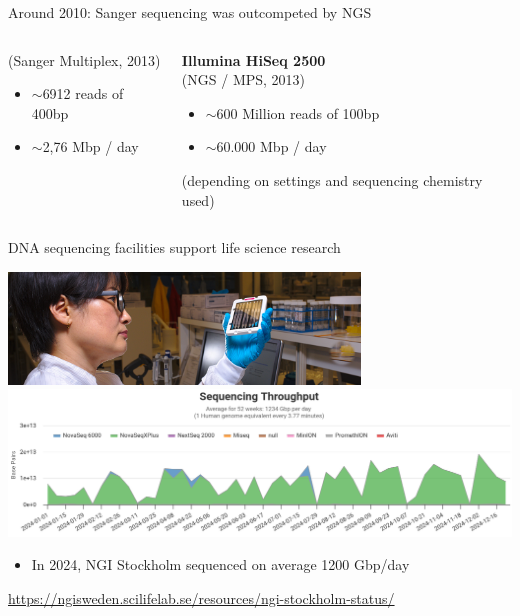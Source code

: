 \documentclass[10pt]{beamer}
\newcommand{\credit}[1]{{\vspace{\fill} \par \raggedleft \scriptsize \mdseries \color{mDarkBrown} #1 \par}}
\begin{document}
\begin{frame}{Around 2010: Sanger sequencing was outcompeted by NGS}
\begin{columns}[T,onlytextwidth]
\begin{exampleblock}{}
			(Sanger Multiplex, 2013)
			\begin{itemize}
				\item $\sim$6912 reads of 400bp
				\item $\sim$2,76 Mbp / day
			\end{itemize}
		\end{exampleblock}
		\begin{exampleblock}{}
			\textbf{Illumina HiSeq 2500}  \vspace{0.3em} \\
			(NGS / MPS, 2013)
			\begin{itemize}
				\item $\sim$600 Million reads of 100bp
				\item $\sim$60.000 Mbp / day
			\end{itemize}
			{ \small (depending on settings and sequencing chemistry used)}
		\end{exampleblock}
	\end{columns}
\end{frame}

\begin{frame}{DNA sequencing facilities support life science research}
	\begin{center}
		\includegraphics[width=0.7\textwidth]{./figures/ngi-choi-flowcell.jpg} \\
		\hspace*{-1cm}
		\includegraphics[width=1.2\textwidth]{./figures/ngis-throughput-2024.png}
	\end{center}
	\begin{itemize}
		\item In 2024, NGI Stockholm sequenced on average 1200 Gbp/day
     \end{itemize}
	\credit{\href{https://ngisweden.scilifelab.se/resources/ngi-stockholm-status/}{https://ngisweden.scilifelab.se/resources/ngi-stockholm-status/}}
\end{frame}
\end{document}
